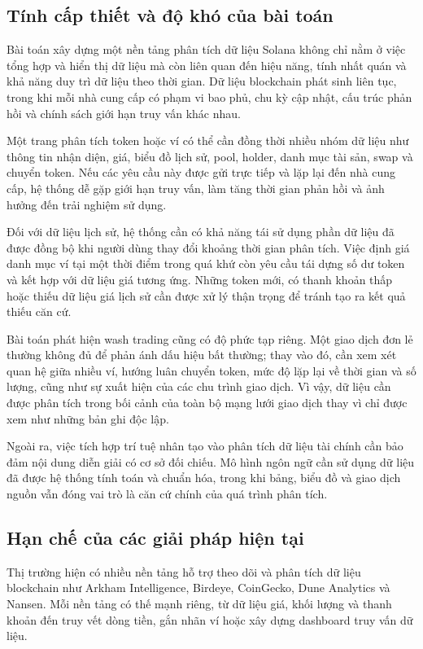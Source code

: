 \subsection{Tính cấp thiết và độ khó của bài toán}

Bài toán xây dựng một nền tảng phân tích dữ liệu Solana không chỉ nằm ở việc tổng hợp và hiển thị dữ liệu mà còn liên quan đến hiệu năng, tính nhất quán và khả năng duy trì dữ liệu theo thời gian. Dữ liệu blockchain phát sinh liên tục, trong khi mỗi nhà cung cấp có phạm vi bao phủ, chu kỳ cập nhật, cấu trúc phản hồi và chính sách giới hạn truy vấn khác nhau.

Một trang phân tích token hoặc ví có thể cần đồng thời nhiều nhóm dữ liệu như thông tin nhận diện, giá, biểu đồ lịch sử, pool, holder, danh mục tài sản, swap và chuyển token. Nếu các yêu cầu này được gửi trực tiếp và lặp lại đến nhà cung cấp, hệ thống dễ gặp giới hạn truy vấn, làm tăng thời gian phản hồi và ảnh hưởng đến trải nghiệm sử dụng.

Đối với dữ liệu lịch sử, hệ thống cần có khả năng tái sử dụng phần dữ liệu đã được đồng bộ khi người dùng thay đổi khoảng thời gian phân tích. Việc định giá danh mục ví tại một thời điểm trong quá khứ còn yêu cầu tái dựng số dư token và kết hợp với dữ liệu giá tương ứng. Những token mới, có thanh khoản thấp hoặc thiếu dữ liệu giá lịch sử cần được xử lý thận trọng để tránh tạo ra kết quả thiếu căn cứ.

Bài toán phát hiện wash trading cũng có độ phức tạp riêng. Một giao dịch đơn lẻ thường không đủ để phản ánh dấu hiệu bất thường; thay vào đó, cần xem xét quan hệ giữa nhiều ví, hướng luân chuyển token, mức độ lặp lại về thời gian và số lượng, cũng như sự xuất hiện của các chu trình giao dịch. Vì vậy, dữ liệu cần được phân tích trong bối cảnh của toàn bộ mạng lưới giao dịch thay vì chỉ được xem như những bản ghi độc lập.

Ngoài ra, việc tích hợp trí tuệ nhân tạo vào phân tích dữ liệu tài chính cần bảo đảm nội dung diễn giải có cơ sở đối chiếu. Mô hình ngôn ngữ cần sử dụng dữ liệu đã được hệ thống tính toán và chuẩn hóa, trong khi bảng, biểu đồ và giao dịch nguồn vẫn đóng vai trò là căn cứ chính của quá trình phân tích.

\subsection{Hạn chế của các giải pháp hiện tại}

Thị trường hiện có nhiều nền tảng hỗ trợ theo dõi và phân tích dữ liệu blockchain như Arkham Intelligence, Birdeye, CoinGecko, Dune Analytics và Nansen. Mỗi nền tảng có thế mạnh riêng, từ dữ liệu giá, khối lượng và thanh khoản đến truy vết dòng tiền, gắn nhãn ví hoặc xây dựng dashboard truy vấn dữ liệu.

